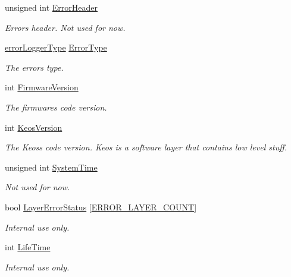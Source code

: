 \begin{DoxyCompactItemize}
\item 
unsigned int \hyperlink{struct_system_error_ab854e1de73db72c8e2fe47a91d58037d}{Error\+Header}
\begin{DoxyCompactList}\small\item\em Error\textquotesingle{}s header. Not used for now. \end{DoxyCompactList}\item 
\hyperlink{_kinova_types_8h_a45d0343c3d465533f72cb2db67fc0b8a}{error\+Logger\+Type} \hyperlink{struct_system_error_a8afdc5f30a9b376b95191c057e37cb7c}{Error\+Type}
\begin{DoxyCompactList}\small\item\em The error\textquotesingle{}s type. \end{DoxyCompactList}\item 
int \hyperlink{struct_system_error_ab58ef88af94b436bbfa4513df71d9f9c}{Firmware\+Version}
\begin{DoxyCompactList}\small\item\em The firmware\textquotesingle{}s code version. \end{DoxyCompactList}\item 
int \hyperlink{struct_system_error_a9e8bbb5be1819da3921241691ba46e23}{Keos\+Version}
\begin{DoxyCompactList}\small\item\em The Keos\textquotesingle{}s code version. Keos is a software layer that contains low level stuff. \end{DoxyCompactList}\item 
unsigned int \hyperlink{struct_system_error_ab6d34bb68ac78bc05dce7803cbb2b5dd}{System\+Time}
\begin{DoxyCompactList}\small\item\em Not used for now. \end{DoxyCompactList}\item 
bool \hyperlink{struct_system_error_a3e8c91938eb3e65d965d3895b55268b3}{Layer\+Error\+Status} \mbox{[}\hyperlink{_kinova_types_8h_ad0fbf72df2f7f710761d002676278db0}{E\+R\+R\+O\+R\+\_\+\+L\+A\+Y\+E\+R\+\_\+\+C\+O\+U\+NT}\mbox{]}
\begin{DoxyCompactList}\small\item\em Internal use only. \end{DoxyCompactList}\item 
int \hyperlink{struct_system_error_ac651a1bd937f272e75a9280d0ea3218d}{Life\+Time}
\begin{DoxyCompactList}\small\item\em Internal use only. \end{DoxyCompactList}\item 

\end{DoxyCompactItemize}
